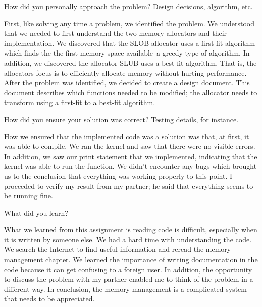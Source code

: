 \documentclass{article}
\newenvironment{question}[2][Question]{\begin{trivlist}
\item[\hskip \labelsep {\bfseries #1}\hskip \labelsep {\bfseries #2.}]}{\end{trivlist}}
\begin{document}

\vspace{0.25in} %

\begin{question}{2}
How did you personally approach the problem? Design decisions, algorithm, etc.
\end{question}
First, like solving any time a problem, we identified the problem. We understood that we needed to first understand the two memory allocators and their implementation. We discovered that the SLOB allocator uses a first-fit algorithm which finds the the first memory space available--a greedy type of algorithm. In addition, we discovered the allocator SLUB uses a best-fit algorithm. That is, the allocators focus is to efficiently allocate memory without hurting performance. After the problem was identified, we decided to create a design document. This document describes which functions needed to be modified; the allocator needs to transform using a first-fit to a best-fit algorithm.




\vspace{0.25in} %

\begin{question}{3}
How did you ensure your solution was correct? Testing details, for instance.
\end{question}
How we ensured that the implemented code was a solution was that, at first, it was able to compile. We ran the kernel and saw that there were no visible errors. In addition, we saw our print statement that we implemented, indicating that the kernel was able to run the function. We didn't encounter any bugs which brought us to the conclusion that everything was working properly to this point.  I proceeded to verify my result from my partner; he said that everything
seems to be running fine.



\vspace{0.25in}
\begin{question}{4}
What did you learn?
\end{question}
What we learned from this assignment is reading code is difficult, especially when it is written by someone else. We had a hard time with understanding the code. We search the Internet to find useful information and reread the memory management chapter. We learned the importance of writing documentation in the code because it can get confusing to a foreign user. In addition, the opportunity to discuss the problem with my partner enabled me to think of the problem in a different way. In conclusion, the memory management is a complicated system that needs to be appreciated.
\end{document}
